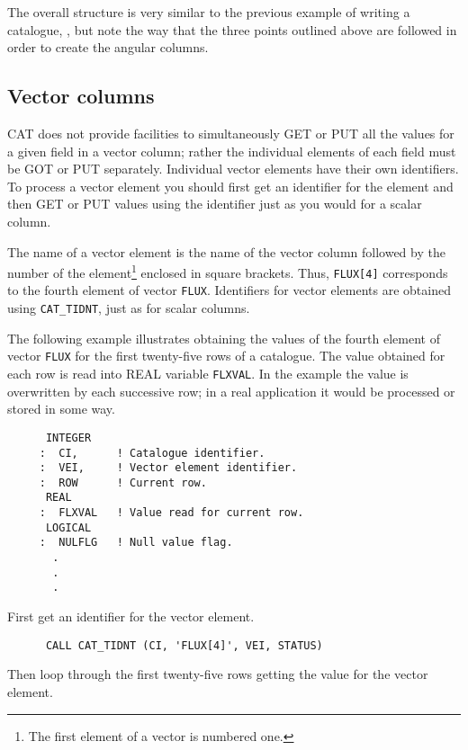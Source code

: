 The overall structure is very similar to the previous example of 
writing a catalogue, 
, but note the way that the three points 
outlined above are followed in order to create the angular columns.


\subsection{Vector columns}

CAT does not provide facilities to simultaneously GET or PUT all the
values for a given field in a vector column; rather the individual
elements of each field must be GOT or PUT separately. Individual
vector elements have their own identifiers. To process a vector element
you should first get an identifier for the element and then GET or
PUT values using the identifier just as you would for a scalar column.

The name of a vector element is the name of the vector column followed
by the number of the element\footnote{The first element of a vector
is numbered one.} enclosed in square brackets. Thus, {\tt FLUX[4]}
corresponds to the fourth element of vector {\tt FLUX}. Identifiers for 
vector elements are obtained using {\tt CAT\_TIDNT}, just as for scalar
columns.

The following example illustrates obtaining the values of the fourth
element of vector {\tt FLUX} for the first twenty-five rows of a 
catalogue. The value obtained for each row is read into REAL variable 
{\tt FLXVAL}. In the example the value is overwritten by each successive
row; in a real application it would be processed or stored in some way.

\begin{verbatim}
      INTEGER
     :  CI,      ! Catalogue identifier.
     :  VEI,     ! Vector element identifier.
     :  ROW      ! Current row.
      REAL
     :  FLXVAL   ! Value read for current row.
      LOGICAL
     :  NULFLG   ! Null value flag.
       .
       .
       .
\end{verbatim}

First get an identifier for the vector element.

\begin{verbatim}
      CALL CAT_TIDNT (CI, 'FLUX[4]', VEI, STATUS)
\end{verbatim}

Then loop through the first twenty-five rows getting the value for the
vector element.

